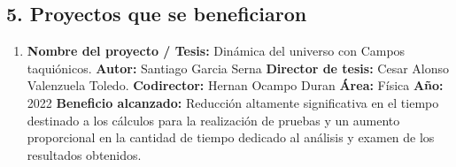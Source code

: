 \begin{spacing}{1.5}
    \begin{tightcenter}
    \section{5. Proyectos que se beneficiaron}
    \end{tightcenter}
    
    \begin{enumerate}
        \item \textbf{Nombre del proyecto / Tesis:} Dinámica del universo con Campos taquiónicos. \newline
        \textbf{Autor:} Santiago Garcia Serna \newline
        \textbf{Director de tesis:} Cesar Alonso Valenzuela Toledo. \newline
        \textbf{Codirector:} Hernan Ocampo Duran \newline
        \textbf{Área:} Física \newline
        \textbf{Año:} 2022 \newline
        \textbf{Beneficio alcanzado:} Reducción altamente significativa en el tiempo destinado a los cálculos para la realización de pruebas y un aumento proporcional en la cantidad de tiempo dedicado al análisis y examen de los resultados obtenidos.
    \end{enumerate}

    
    \mylinespacing
    \mylinespacing
    \begin{tightcenter}
    \end{tightcenter}
    \end{spacing}
    